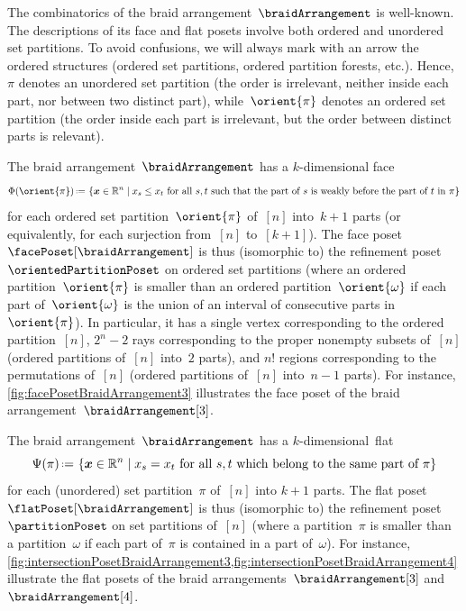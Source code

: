 \documentclass{amsart}
\theoremstyle{definition}
\newcommand{\R}{\mathbb{R}} %
\renewcommand{\b}[1]{{\boldsymbol{#1}}} %
\newcommand{\set}[2]{\left\{ #1 \;\middle|\; #2 \right\}} %
\newcommand{\eqdef}{\mbox{\,\raisebox{0.2ex}{\scriptsize\ensuremath{\mathrm:}}\ensuremath{=}\,}} %
\renewcommand{\b}[1]{\boldsymbol{#1}} %
\begin{document}
The combinatorics of the braid arrangement~$\braidArrangement$ is well-known.
The descriptions of its face and flat posets involve both ordered and unordered set partitions.
To avoid confusions, we will always mark with an arrow the ordered structures (ordered set partitions, ordered partition forests, etc.).
Hence, $\pi$ denotes an unordered set partition (the order is irrelevant, neither inside each part, nor between two distinct part), while~$\orient{\pi}$ denotes an ordered set partition (the order inside each part is irrelevant, but the order between distinct parts is relevant).

The braid arrangement~$\braidArrangement$ has a $k$-dimensional face
\[
\Phi(\orient{\pi}) \eqdef \set{\b{x} \in \R^n}{x_s \le x_t \text{ for all $s,t$ such that the part of~$s$ is weakly before the part of~$t$ in $\pi$}}
\]
for each ordered set partition~$\orient{\pi}$ of~$[n]$ into~$k+1$ parts (or equivalently, for each surjection from~$[n]$ to~$[k+1]$).
The face poset~$\facePoset[\braidArrangement]$ is thus (isomorphic to) the refinement poset~$\orientedPartitionPoset$ on ordered set partitions (where an ordered partition~$\orient{\pi}$ is smaller than an ordered partition~$\orient{\omega}$ if each part of~$\orient{\omega}$ is the union of an interval of consecutive parts in~$\orient{\pi}$).
In particular, it has a single vertex corresponding to the ordered partition~$[n]$, $2^n-2$ rays corresponding to the proper nonempty subsets of~$[n]$ (ordered partitions of~$[n]$ into~$2$ parts), and $n!$ regions corresponding to the permutations of~$[n]$ (ordered partitions of~$[n]$ into~$n-1$ parts).
For instance, \cref{fig:facePosetBraidArrangement3} illustrates the face poset of the braid arrangement~$\braidArrangement[3]$.

The braid arrangement~$\braidArrangement$ has a $k$-dimensional~flat
\[
\Psi(\pi) \eqdef \set{\b{x} \in \R^n}{x_s = x_t \text{ for all  $s, t$ which belong to the same part of~$\pi$}}
\]
for each (unordered) set partition~$\pi$ of~$[n]$ into $k+1$ parts.
The flat poset~$\flatPoset[\braidArrangement]$ is thus (isomorphic to) the refinement poset~$\partitionPoset$ on set partitions of~$[n]$ (where a partition~$\pi$ is smaller than a partition~$\omega$ if each part of~$\pi$ is contained in a part of~$\omega$).
For instance, \cref{fig:intersectionPosetBraidArrangement3,fig:intersectionPosetBraidArrangement4} illustrate the flat posets of the braid arrangements~$\braidArrangement[3]$ and~$\braidArrangement[4]$.
\end{document}
